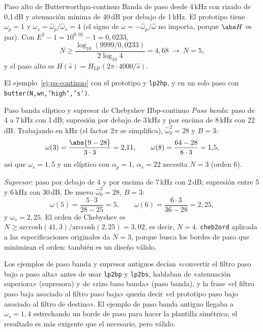 \documentclass[11pt,a4paper]{scrartcl}
\begin{document}
\begin{ejemplo}{Paso alto de Butterworth}{pa-continuo}
  Banda de paso desde 4\,kHz con rizado de 0,1\,dB y atenuación mínima de 40\,dB por debajo de 1\,kHz. El prototipo tiene $\omega_p=1$ y $\omega_s=\hat\omega_p/\hat\omega_s=4$ (el signo de $\omega=-\hat\omega_p/\hat\omega$ no importa, porque $\abs H$ es par). Con $E^2-1=10^{0,01}-1=0{,}0233$,
  \[
    N\ge\frac{\log_{10}(9999/0{,}0233)}{2\log_{10}4}=4{,}68\ \to\ N=5,
  \]
  y el paso alto es $H(\hat s)=H_{\text{LP}}(2\pi\cdot4000/\hat s)$.
\end{ejemplo}

\begin{encodigo}
  El ejemplo~\ref{ej:pa-continuo} con el prototipo y \texttt{lp2hp}, y en un solo paso con \texttt{butter(N,wn,'high','s')}.
\end{encodigo}

\begin{ejemplo}{Paso banda elíptico y supresor de Chebyshev II}{bp-continuo}
  \emph{Paso banda}: paso de 4 a 7\,kHz con 1\,dB; supresión por debajo de 3\,kHz y por encima de 8\,kHz con 22\,dB. Trabajando en kHz (el factor $2\pi$ se simplifica), $\hat\omega_0^2=28$ y $B=3$:
  \[
    \omega(3)=\frac{\abs{9-28}}{3\cdot3}=2{,}11,\qquad\omega(8)=\frac{64-28}{8\cdot3}=1{,}5,
  \]
  así que $\omega_s=1{,}5$ y un elíptico con $\alpha_p=1$, $\alpha_s=22$ necesita $N=3$ (orden 6).

  \emph{Supresor}: paso por debajo de 4 y por encima de 7\,kHz con 2\,dB; supresión entre 5 y 6\,kHz con 30\,dB. De nuevo $\hat\omega_0^2=28$, $B=3$:
  \[
    \omega(5)=\frac{5\cdot3}{28-25}=5,\qquad\omega(6)=\frac{6\cdot3}{36-28}=2{,}25,
  \]
  y $\omega_s=2{,}25$. El orden de Chebyshev es $N\ge\mathrm{arccosh}(41{,}3)/\mathrm{arccosh}(2{,}25)=3{,}02$, es decir, $N=4$. \texttt{cheb2ord} aplicada a las especificaciones originales da $N=3$, porque busca los bordes de paso que minimizan el orden: también es un diseño válido.
\end{ejemplo}

\begin{errata}
  Los ejemplos de paso banda y supresor antiguos decían «convertir el filtro paso bajo a paso alta» antes de usar \texttt{lp2bp} y \texttt{lp2bs}, hablaban de «atenuación superiora» (supresora) y de «rizo baso banda» (paso banda), y la frase «el filtro paso baja asociado al filtro paso baja» quería decir «el prototipo paso bajo asociado al filtro de destino». El ejemplo de paso banda antiguo llegaba a $\omega_s=1{,}4$ estrechando un borde de paso para hacer la plantilla simétrica; el resultado es más exigente que el necesario, pero válido.
\end{errata}
\end{document}
